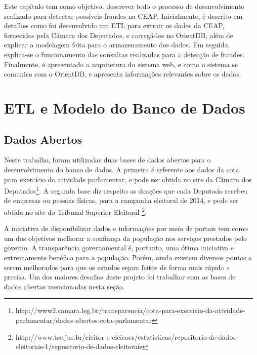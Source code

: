 	Este capítulo tem como objetivo, descrever todo o processo de desenvolvimento realizado para detectar possíveis fraudes na CEAP. Inicialmente, é descrito em detalhes como foi desenvolvido um ETL para extrair os dados da CEAP, fornecidos pela Câmara dos Deputados, e carregá-los no OrientDB, além de explicar a modelagem feita para o armazenamento dos dados. Em seguida, explica-se o funcionamento das consultas realizadas para a detecção de fraudes. Finalmente, é apresentado a arquitetura do sistema web, e como o sistema se comunica com o OrientDB, e apresenta informações relevantes sobre os dados.

\section{ETL e Modelo do Banco de Dados}

\subsection{Dados Abertos}

Neste trabalho, foram utilizadas duas bases de dados abertos para o desenvolvimento do banco de dados. A primeira é referente aos dados da cota para exercício da atividade parlamentar, e pode ser obtida no site da Câmara dos Deputados\footnote{http://www2.camara.leg.br/transparencia/cota-para-exercicio-da-atividade-parlamentar/dados-abertos-cota-parlamentar}. A segunda base diz respeito as doações que cada Deputado recebeu de empresas ou pessoas físicas, para a campanha eleitoral de 2014, e pode ser obtida no site do Tribunal Superior Eleitoral \footnote{http://www.tse.jus.br/eleitor-e-eleicoes/estatisticas/repositorio-de-dados-eleitorais-1/repositorio-de-dados-eleitorais}.

A iniciativa de disponibilizar dados e informações por meio de portais tem como um dos objetivos melhorar a confiança da população nos serviços prestados pelo governo. A transparência governamental é, portanto, uma ótima iniciativa e extremamente benéfica para a população. Porém, ainda existem diversos pontos a serem melhorados para que os estudos sejam feitos de forma mais rápida e precisa. Um dos maiores desafios deste projeto foi trabalhar com as bases de dados abertas mencionadas nesta seção.

